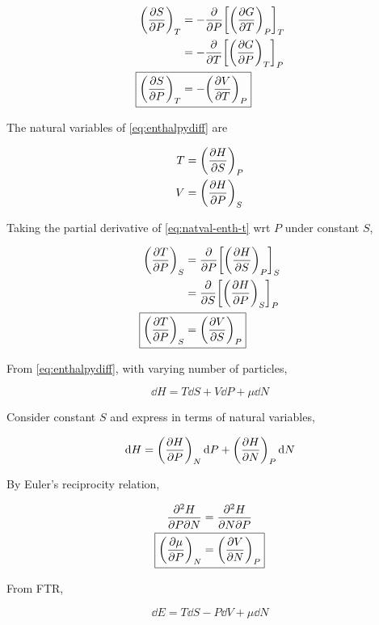 \documentclass[9pt,a4paper,twocolumn]{article}
\begin{document}
\begin{align}
	\qty(\pdv{S}{P})_T &= -\pdv{P}\qty[\qty(\pdv{G}{T})_P]_T \nonumber \\
	&= -\pdv{T} \qty[\qty(\pdv{G}{P})_T]_P \nonumber \\
	\Aboxed{
		\qty(\pdv{S}{P})_T &= -\qty(\pdv{V}{T})_P
	} \label{eq:proof-spt}
\end{align}

The natural variables of \eqref{eq:enthalpydiff} are

\begin{align}
	T &= \qty(\pdv{H}{S})_P \label{eq:natval-enth-t} \\
	V &= \qty(\pdv{H}{P})_S \label{eq:natval-enth-v}
\end{align}

Taking the partial derivative of \eqref{eq:natval-enth-t} wrt $P$ under constant $S$,

\begin{align}
	\qty(\pdv{T}{P})_S &= \pdv{P}\qty[\qty(\pdv{H}{S})_P]_S \nonumber \\
	&= \pdv{S} \qty[\qty(\pdv{H}{P})_S]_P \nonumber \\
	\Aboxed{
		\qty(\pdv{T}{P})_S &= \qty(\pdv{V}{S})_P
	} \label{eq:proof-tps}
\end{align}

From \eqref{eq:enthalpydiff}, with varying number of particles,

\begin{equation}
	\dd{H} = T\dd{S} + V\dd{P} + \mu\dd{N}
\end{equation}

Consider constant $S$ and express in terms of natural variables,

\begin{equation}
	\dd{H} = \qty(\pdv{H}{P})_N \dd{P} + \qty(\pdv{H}{N})_P \dd{N}
\end{equation}

By Euler's reciprocity relation,

\begin{align}
	\pdv{H}{P}{N} &= \pdv{H}{N}{P} \\
	\Aboxed{
		\qty(\pdv{\mu}{P})_N &= \qty(\pdv{V}{N})_P
	} \label{eq:proof-mupn}
\end{align}

From FTR,

\begin{equation}
	\dd{E} = T\dd{S} - P\dd{V} + \mu\dd{N}
\end{equation}
\end{document}
